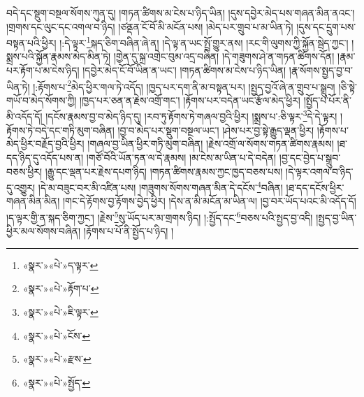 བདེ་དང་སྡུག་བསྔལ་སོགས་ཀུན་དུ། །གཏན་ཚིགས་མ་ངེས་པ་ཉིད་ཡིན། །དུས་དབྱེར་མེད་པས་གཞན་མིན་ནའང་། །གྲགས་དང་ལུང་དང་འགལ་བ་ཉིད། །ཙནྡན་ངོ་བོ་མི་མངོན་པས། །མེད་པར་གྲུབ་པ་མ་ཡིན་ཏེ། །དུས་དང་དྲུག་པས་བསྟན་པའི་ཕྱིར། །:དེ་ལྟར་\footnote{«སྣར་»«པེ་»ད་ལྟར་}སྐད་ཅིག་བཞིན་ཞེ་ན། །དེ་ལྟ་ན་ཡང་སྤྲོ་གྱུར་ནས། །རང་གི་ལུགས་ཀྱི་སྐྱོན་སྦེད་ཀྱང་། །སྨྲས་པའི་སྐྱོན་རྣམས་མེད་མིན་ཏེ། །གྱེན་དུ་སྐྲ་འགྲེང་བུམ་འདྲ་བཞིན། །དེ་གཟུགས་ཤེ་ན་གཏན་ཚིགས་དོན། །རྣམ་པར་རྟོག་པ་མ་ངེས་ཉིད། །དབྱེར་མེད་ངོ་བོ་ཡིན་ན་ཡང་། །གཏན་ཚིགས་མ་ངེས་པ་ཉིད་ཡིན། །རྣ་སོགས་སྤྱད་བྱ་བ་ཡིན་ཏེ། །:རྟོགས་པ་\footnote{«སྣར་»«པེ་»རྟོག་པ་}མེད་ཕྱིར་གལ་ཏེ་འདོད། །ཁྱད་པར་དག་ནི་མ་བསྟན་པར། །སྤྱད་བྱའོ་ཞེ་ན་གྲུབ་པ་སྒྲུབ། །ཅི་སྟེ་གཡོ་བ་མེད་སོགས་ཀྱི། །ཁྱད་པར་ཅན་ན་རྗེས་འགྲོ་གང་། །རྟོགས་པར་བདེན་ཡང་རྩོལ་མེད་ཕྱིར། །སྤྱོད་པ་པོར་ནི་མི་འདོད་དོ། །དངོས་རྣམས་བྱ་བ་མེད་ཉིད་དུ། །རབ་ཏུ་རྟོགས་ཏེ་གཞལ་བྱའི་ཕྱིར། །སྨྲས་པ་:ཅི་ལྟར་\footnote{«སྣར་»«པེ་»ཇི་ལྟར་}དེ་དེ་ལྟར། །རྟོགས་ཏེ་བདེ་དང་གཏི་མུག་བཞིན། །བྱ་བ་མེད་པར་སྡུག་བསྔལ་ཡང་། །ཤེས་པར་བྱ་སྟེ་རྒྱུད་ལྡན་ཕྱིར། །རྟོགས་པ་མེད་ཕྱིར་བརྗོད་བྱའི་ཕྱིར། །གཞལ་བྱ་ཡིན་ཕྱིར་གཏི་མུག་བཞིན། །རྗེས་འགྲོ་ལ་སོགས་གཏན་ཚིགས་རྣམས། །ཐ་དད་ཉིད་དུ་འདོད་པས་ན། །གཙོ་བོའི་ཡོན་ཏན་ལ་དེ་རྣམས། །མ་ངེས་མ་ཡིན་པ་དེ་བདེན། །བྱ་དང་བྱེད་པ་སྒྲུབ་བཅས་ཕྱིར། །རྒྱུ་དང་ལྡན་པར་རྗེས་དཔག་ཉིད། །གཏན་ཚིགས་རྣམས་ཀྱང་ཁྱད་བཅས་པས། །དེ་ལྟར་འགལ་བ་ཉིད་དུ་འགྱུར། །དེ་མ་བཟུང་བར་མི་འཛིན་པས། །གཟུགས་སོགས་གཞན་མིན་དེ་དངོས་\footnote{«སྣར་»«པེ་»ངོས་}བཞིན། །ཐ་དད་དངོས་ཕྱིར་གཞན་མིན་མིན། །གང་དེ་རྟོགས་བྱ་རྟོགས་བྱེད་ཕྱིར། །དེས་ན་མི་མངོན་མ་ཡིན་ལ། །བྱ་བར་ཡོད་པའང་མི་འདོད་དོ། །ད་ལྟར་གྱི་ན་སྐད་ཅིག་ཀྱང་། །རྗེས་\footnote{«སྣར་»«པེ་»རྫས་}སུ་ཡོད་པར་མ་གྲགས་ཉིད། །:སྤྱོད་དང་\footnote{«སྣར་»«པེ་»སྤྱོད་}བཅས་པའི་སྤྱད་བྱ་འདི། །སྤྱད་བྱ་ཡིན་ཕྱིར་མལ་སོགས་བཞིན། །རྟོགས་པ་པོ་ནི་སྤྱོད་པ་ཉིད། །
